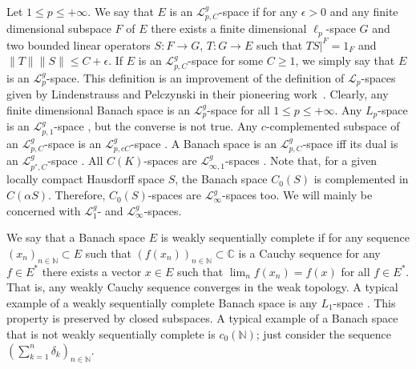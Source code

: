 Let $1\leq p\leq +\infty$. We say that $E$ is an $\mathscr{L}_{p,C}^g$-space if
for any $\epsilon>0$ and any finite dimensional subspace $F$ of $E$ there exists
a finite dimensional $\ell_p$-space $G$ and two bounded linear operators 
$S:F\to G$, $T:G\to E$ such that $TS|^F=1_F$ and 
$\lVert T\rVert\lVert S\rVert\leq C+\epsilon$. 
If $E$ is an $\mathscr{L}_{p,C}^g$-space for some $C\geq 1$, we
simply say that $E$ is an $\mathscr{L}_p^g$-space. This definition
\cite[definition 23.1]{DefFloTensNorOpId} is an improvement of the definition
of $\mathscr{L}_p$-spaces given by Lindenstrauss and Pelczynski in their
pioneering work~\cite{LinPelAbsSumOpInLpSpAndApp}. Clearly, any finite
dimensional Banach space is an $\mathscr{L}_p^g$-space for 
all $1\leq p\leq +\infty$. Any $L_p$-space is an $\mathscr{L}_{p,1}^g$-space
\cite[exercise 4.7]{DefFloTensNorOpId}, but the converse is not true. Any
$c$-complemented subspace of an $\mathscr{L}_{p,C}^g$-space is an
$\mathscr{L}_{p,cC}^g$-space \cite[corollary 23.2.1(2)]{DefFloTensNorOpId}. A
Banach space is an $\mathscr{L}_{p,C}^g$-space iff its dual is an
$\mathscr{L}_{p^*,C}^g$-space \cite[corollary 23.2.1(1)]{DefFloTensNorOpId}.
All $C(K)$-spaces are $\mathscr{L}_{\infty, 1}^g$-spaces
\cite[lemma 4.4]{DefFloTensNorOpId}. Note that, for a given locally compact
Hausdorff space $S$, the Banach space $C_0(S)$ is complemented in $C(\alpha S)$.
Therefore, $C_0(S)$-spaces are $\mathscr{L}_\infty^g$-spaces too. We will mainly
be concerned with $\mathscr{L}_1^g$- and $\mathscr{L}_\infty^g$-spaces.

We say that a Banach space $E$ is weakly sequentially complete if for any
sequence ${(x_n)}_{n\in\mathbb{N}}\subset E$ such that
${(f(x_n))}_{n\in\mathbb{N}}\subset\mathbb{C}$ is a Cauchy sequence for 
any $f\in E^*$ there exists a vector $x\in E$ 
such that $\lim_n f(x_n)=f(x)$ for all $f\in E^*$. That is, any weakly 
Cauchy sequence converges in the weak topology. A typical example of a weakly 
sequentially complete Banach space is any $L_1$-space
\cite[corollary III.C.14]{WojBanSpForAnalysts}. This property is preserved by
closed subspaces. A typical example of a Banach space that is not weakly
sequentially complete is $c_0(\mathbb{N})$; just consider the sequence
${(\sum_{k=1}^n \delta_k)}_{n\in\mathbb{N}}$.

